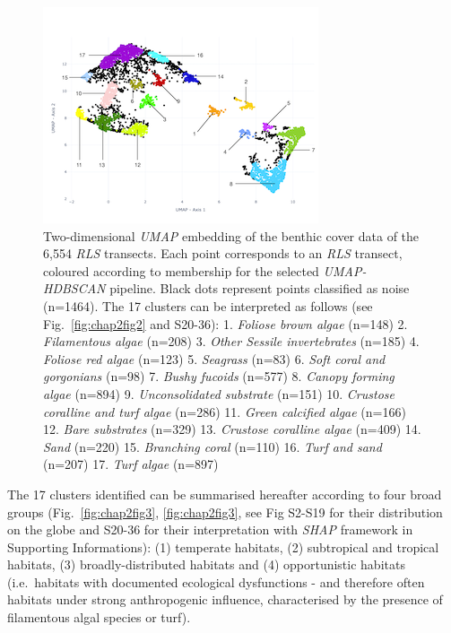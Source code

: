 \begin{refsection}
\begin{figure}
\hypertarget{fig:chap2fig1}{%
\centering
\includegraphics{03-Chapitre2/figures/fig1.png}
\caption[Two-dimensional \emph{UMAP} embedding of the benthic cover data
of the 6,554 \emph{RLS} transects.]{\footnotesize Two-dimensional \emph{UMAP} embedding of the benthic cover data
of the 6,554 \emph{RLS} transects. Each point corresponds to an \emph{RLS}
transect, coloured according to membership for the selected
\emph{UMAP-HDBSCAN} pipeline. Black dots represent points classified as
noise (n=1464). The 17 clusters can be interpreted as follows (see
Fig.~\ref{fig:chap2fig2} and S20-36): 1. \emph{Foliose brown algae}
(n=148) 2. \emph{Filamentous algae} (n=208) 3. \emph{Other Sessile
invertebrates} (n=185) 4. \emph{Foliose red algae} (n=123) 5.
\emph{Seagrass} (n=83) 6. \emph{Soft coral and gorgonians} (n=98) 7.
\emph{Bushy fucoids} (n=577) 8. \emph{Canopy forming algae} (n=894) 9.
\emph{Unconsolidated substrate} (n=151) 10. \emph{Crustose coralline and
turf algae} (n=286) 11. \emph{Green calcified algae} (n=166) 12.
\emph{Bare substrates} (n=329) 13. \emph{Crustose coralline algae}
(n=409) 14. \emph{Sand} (n=220) 15. \emph{Branching coral} (n=110) 16.
\emph{Turf and sand} (n=207) 17. \emph{Turf algae}
(n=897)}\label{fig:chap2fig1}
}
\end{figure}

\clearpage

The 17 clusters identified can be summarised hereafter according to four
broad groups (Fig.~\ref{fig:chap2fig3}, \ref{fig:chap2fig3}, see Fig S2-S19 for their
distribution on the globe and S20-36 for their interpretation with
\emph{SHAP} framework in Supporting Informations): (1) temperate
habitats, (2) subtropical and tropical habitats, (3) broadly-distributed
habitats and (4) opportunistic habitats (i.e.~habitats with documented
ecological dysfunctions - and therefore often habitats under strong
anthropogenic influence, characterised by the presence of filamentous
algal species or turf).


\end{refsection}
